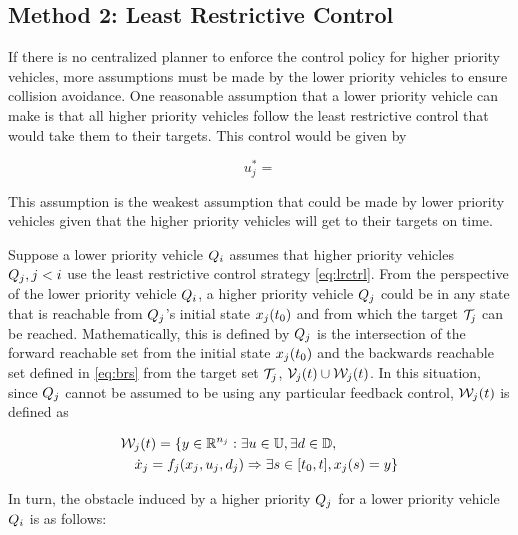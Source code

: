 \subsection{Method 2: Least Restrictive Control}
If there is no centralized planner  to enforce the control policy for higher priority vehicles, more assumptions must be made by the lower priority vehicles to ensure collision avoidance. One reasonable assumption that a lower priority vehicle can make is that all higher priority vehicles follow the least restrictive control that would take them to their targets. This control would be given by 

\begin{equation}
\label{eq:lrctrl} %
u_j^* =
\end{equation}

This assumption is the weakest assumption that could be made by lower priority vehicles given that the higher priority vehicles will get to their targets on time.

Suppose a lower priority vehicle $Q_i$ assumes that higher priority vehicles $Q_j, j < i$ use the least restrictive control strategy \eqref{eq:lrctrl}. From the perspective of the lower priority vehicle $Q_i$, a higher priority vehicle $Q_j$ could be in any state that is reachable from $Q_j$'s initial state $x_j(t_0)$ and from which the target $\mathcal{T}_j$ can be reached. Mathematically, this is defined by $Q_j$ is the intersection of the forward reachable set from the initial state $x_j(t_0)$ and the backwards reachable set defined in \eqref{eq:brs} from the target set $\mathcal{T}_j$, $\mathcal{V}_j(t) \cup \mathcal{W}_j(t)$. In this situation, since $Q_j$ cannot be assumed to be using any particular feedback control, $\mathcal{W}_j(t)$ is defined as

\begin{equation}
\label{eq:frs2}
\begin{aligned}
&\mathcal{W}_j(t) = \{y \in \mathbb{R}^{n_j}: \exists u \in \mathbb{U}, \exists d \in \mathbb{D}, \\
& \quad \dot{x}_j = f_j(x_j, u_j, d_j) \Rightarrow \exists s \in [t_0, t], x_j(s) = y\}
\end{aligned}
\end{equation}

In turn, the obstacle induced by a higher priority $Q_j$ for a lower priority vehicle $Q_i$ is as follows:

